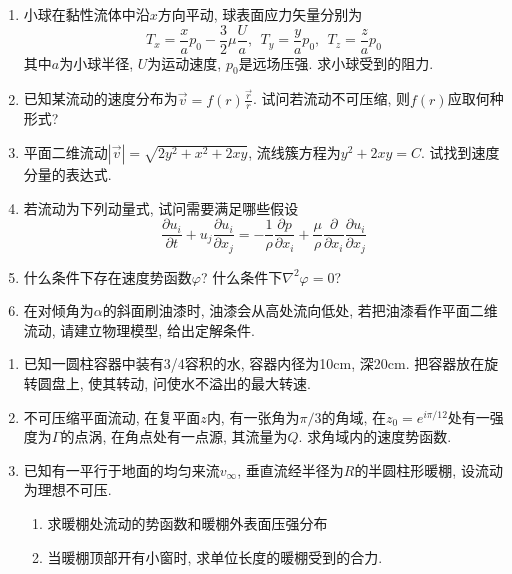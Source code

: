 
\begin{enumerate}
\item 小球在黏性流体中沿$x$方向平动, 球表面应力矢量分别为
\[
T_x = \frac{x}{a}p_0 -\frac{3}{2}\mu\frac{U}{a},{~~} T_y = \frac{y}{a}p_0,{~~} T_z = \frac{z}{a}p_0
\]
其中$a$为小球半径, $U$为运动速度, $p_0$是远场压强. 求小球受到的阻力.
\vspace{0.5em}
\item 已知某流动的速度分布为$\vec{v}=f(r)\frac{\vec{r}}{r}$. 试问若流动不可压缩, 则$f(r)$应取何种形式?
\vspace{0.5em}
\item 平面二维流动$|\vec{v}|=\sqrt{2y^2+x^2+2xy}$, 流线簇方程为$y^2+2xy=C$. 试找到速度分量的表达式.
\vspace{0.5em}
\item 若流动为下列动量式, 试问需要满足哪些假设
      \[
      \frac{\partial u_i}{\partial t} + u_j \frac{\partial u_i}{\partial x_j} = -\frac{1}{\rho}\frac{\partial p}{\partial x_i} + \frac{\mu}{\rho}\frac{\partial}{\partial x_i}\frac{\partial u_i}{\partial x_j}
      \]
\vspace{0.5em}
\item 什么条件下存在速度势函数$\varphi$? 什么条件下$\nabla^2\varphi=0$?
\vspace{0.5em}
\item 在对倾角为$\alpha$的斜面刷油漆时, 油漆会从高处流向低处, 若把油漆看作平面二维流动, 请建立物理模型, 给出定解条件.
\end{enumerate}

\vspace{3em}
\begin{enumerate}
\item 已知一圆柱容器中装有3/4容积的水, 容器内径为10cm, 深20cm. 把容器放在旋转圆盘上, 使其转动, 问使水不溢出的最大转速.
\vspace{0.5em}
\item 不可压缩平面流动, 在复平面$z$内, 有一张角为$\pi/3$的角域, 在$z_0=e^{i\pi/12}$处有一强度为$\Gamma$的点涡, 在角点处有一点源, 其流量为$Q$. 求角域内的速度势函数.
\vspace{0.5em}
\item 已知有一平行于地面的均匀来流$v_\infty$, 垂直流经半径为$R$的半圆柱形暖棚, 设流动为理想不可压.
    \begin{enumerate}
    \item 求暖棚处流动的势函数和暖棚外表面压强分布
    \item 当暖棚顶部开有小窗时, 求单位长度的暖棚受到的合力.
    \end{enumerate}
\end{enumerate}

